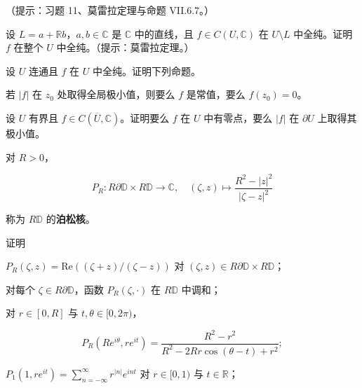 \begin{exercises}
（提示：习题 11、莫雷拉定理与命题 VII.6.7。）

\item

设 $ L = a + \mathbb{R}b $，$ a,b \in \mathbb{C} $ 是 $ \mathbb{C} $ 中的直线，且 $ f \in C(U,\mathbb{C}) $ 在 $ U \setminus L $ 中全纯。证明 $ f $ 在整个 $ U $ 中全纯。（提示：莫雷拉定理。）

\item

设 $ U $ 连通且 $ f $ 在 $ U $ 中全纯。证明下列命题。

\begin{items}
\item

若 $ |f| $ 在 $ z_0 $ 处取得全局极小值，则要么 $ f $ 是常值，要么 $ f(z_0) = 0 $。

\item

设 $ U $ 有界且 $ f \in C(\overline{U},\mathbb{C}) $。证明要么 $ f $ 在 $ U $ 中有零点，要么 $ |f| $ 在 $ \partial U $ 上取得其极小值。

\end{items}

\item

对 $ R > 0 $，

\[
P_R : R\partial\mathbb{D} \times R\mathbb{D} \to \mathbb{C} , \quad (\zeta,z) \mapsto \frac{R^2 - |z|^2}{|\zeta - z|^2}
\]

称为 $ R\mathbb{D} $ 的\textbf{泊松核}。

证明

\begin{items}
\item

$ P_R(\zeta,z) = \mathrm{Re}\left((\zeta + z)/(\zeta - z)\right) $ 对 $ (\zeta,z) \in R\partial\mathbb{D} \times R\mathbb{D} $；

\item

对每个 $ \zeta \in R\partial\mathbb{D} $，函数 $ P_R(\zeta,\cdot) $ 在 $ R\mathbb{D} $ 中调和；

\item

对 $ r \in [0,R] $ 与 $ t,\theta \in [0,2\pi) $，

\[
P_R(Re^{i\theta}, re^{it}) = \frac{R^2 - r^2}{R^2 - 2Rr\cos(\theta - t) + r^2} ;
\]
\item

$ P_1(1, re^{it}) = \sum_{n=-\infty}^{\infty} r^{|n|}e^{int} $ 对 $ r \in [0,1) $ 与 $ t \in \mathbb{R} $；


\end{items}
\end{exercises}
